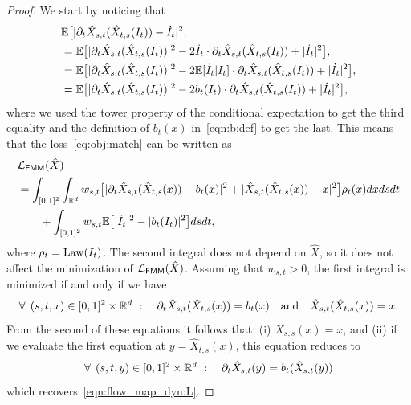 \fmm*
\begin{proof} We start by noticing that
	\begin{equation}
		\label{eq:step1}
		\begin{aligned}
			 & \mathbb{E} \big [| \partial_t \hat X_{s,t} (\hat X_{t,s}(I_t)) - \dot{I}_t|^2,                                                                           \\
			 & = \mathbb{E} \big [| \partial_t \hat X_{s,t} (\hat X_{t,s}(I_t))|^2 - 2 \dot{I}_t \cdot \partial_t \hat X_{s,t} (\hat X_{t,s}(I_t)) + |\dot I_t|^2\big], \\
			 & = \mathbb{E} \big [| \partial_t \hat X_{s,t} (\hat X_{t,s}(I_t))|^2 - 2 \mathbb{E}[ \dot I_t|I_t]\cdot
			\partial_t \hat X_{s,t} (\hat X_{t,s}(I_t)) + |\dot I_t|^2\big],                                                                                    \\
			 & = \mathbb{E} \big [| \partial_t \hat X_{s,t} (\hat X_{t,s}(I_t))|^2 - 2 b_t(I_t)\cdot
				\partial_t \hat X_{s,t} (\hat X_{t,s}(I_t)) + |\dot I_t|^2\big],
		\end{aligned}
	\end{equation}
	where we used the tower property of the conditional expectation to get the third equality and the definition of $b_t(x)$ in~\eqref{eqn:b:def} to get the last. This means that the loss~\eqref{eq:obj:match} can be written as
	\begin{equation}
		\label{eq:obj:match:2}
		\begin{aligned}
			 & \mathcal{L}_{\mathsf{FMM}}(\hat X)                                                                                                                                               \\
			 & = \int_{[0,1]^2} \int_{\mathbb{R}^d} w_{s,t} \big [| \partial_t \hat X_{s,t} (\hat X_{t,s}(x)) - b_t(x)|^2 + | \hat X_{s,t} (\hat X_{t,s}(x)) - x|^2 \big] \rho_t(x) dx ds dt \\
			 & \qquad + \int_{[0,1]^2} w_{s,t} \mathbb{E}\big[ |\dot I_t|^2 - |b_t(I_t)|^2\big] ds dt,
		\end{aligned}
	\end{equation}
	where $\rho_t = \operatorname{Law}(I_t)$. The second integral does not depend on $\hat X$, so it does not affect the minimization of $\mathcal{L}_{\mathsf{FMM}}(\hat X)$. Assuming that $w_{s,t}>0$, the first integral is minimized if and only if we have
	\begin{equation}
		\label{eq:obj:match:3}
		\begin{aligned}
			\forall \:\: (s,t,x) \in [0,1]^2\times \mathbb{R}^d \ : \quad  \partial_t \hat X_{s,t} (\hat X_{t,s}(x)) = b_t(x) \quad \text{and} \quad \hat X_{s,t} (\hat X_{t,s}(x)) = x.
		\end{aligned}
	\end{equation}
	From the second of these equations it follows that: (i)  $\hat X_{s,s}(x) =x$, and (ii) if we evaluate the first equation at $y= \hat X_{t,s}(x)$, this equation reduces to
	\begin{equation}
		\label{eq:obj:mmm:sol}
		\forall \:\: (s,t,y) \in [0,1]^2\times \mathbb{R}^d \ : \quad\partial_t \hat X_{s,t}(y) = b_t(\hat X_{s,t}(y))
	\end{equation}
	which recovers~\eqref{eqn:flow_map_dyn:L}.
\end{proof}

